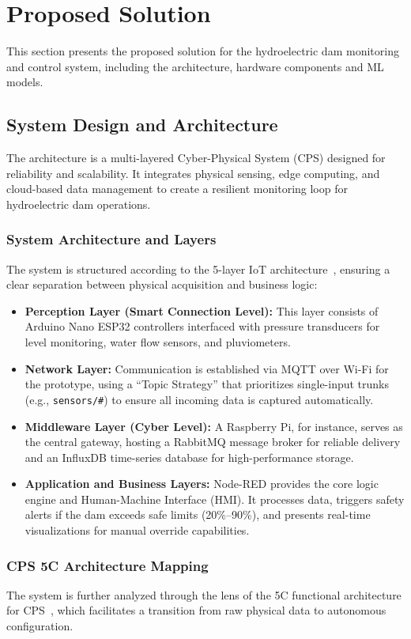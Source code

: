 \section{Proposed Solution}\label{sec:proposed-solution}
This section presents the proposed solution for the hydroelectric dam monitoring and control system, including the architecture, hardware components and ML models.

\subsection{System Design and Architecture}
The architecture is a multi-layered Cyber-Physical System (CPS) designed for reliability and scalability. It integrates physical sensing, edge computing, and cloud-based data management to create a resilient monitoring loop for hydroelectric dam operations.

\subsubsection{System Architecture and Layers}
The system is structured according to the 5-layer IoT architecture~\cite{iot_architecture}, ensuring a clear separation between physical acquisition and business logic:
\begin{itemize}
    \item \textbf{Perception Layer (Smart Connection Level):} This layer consists of Arduino Nano ESP32 controllers interfaced with pressure transducers for level monitoring, water flow sensors, and pluviometers.
    \item \textbf{Network Layer:} Communication is established via MQTT over Wi-Fi for the prototype, using a ``Topic Strategy'' that prioritizes single-input trunks (e.g., \texttt{sensors/\#}) to ensure all incoming data is captured automatically.
    \item \textbf{Middleware Layer (Cyber Level):} A Raspberry Pi, for instance, serves as the central gateway, hosting a RabbitMQ message broker for reliable delivery and an InfluxDB time-series database for high-performance storage.
    \item \textbf{Application and Business Layers:} Node-RED provides the core logic engine and Human-Machine Interface (HMI). It processes data, triggers safety alerts if the dam exceeds safe limits (20\%--90\%), and presents real-time visualizations for manual override capabilities.
\end{itemize}

\subsubsection{CPS 5C Architecture Mapping}
The system is further analyzed through the lens of the 5C functional architecture for CPS~\cite{cps_5c_architecture}, which facilitates a transition from raw physical data to autonomous configuration.

